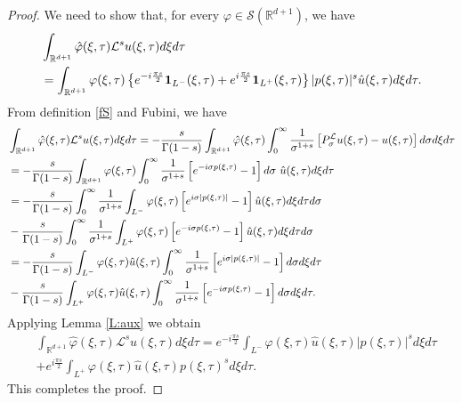 \documentclass[11pt,letter]{amsart}
\def \R {\mathbb{R}}
\def \G{\Gamma}
\def \vf{\varphi}
\numberwithin{equation}{section}
\numberwithin{equation}{section}
\begin{document}
\begin{proof}
 We need to show that, for every $\vf\in \mathscr S(\R^{d+1})$, we have
\begin{align}\label{ex}
& \int_{\R^{d+1}} \hat \vf(\xi,\tau) \mathcal L^{s} u(\xi,\tau) d\xi d\tau
\\
& = \int_{\R^{d+1}} \vf(\xi,\tau) \left\{e^{-i\frac{\pi s}2} \mathbf 1_{L^-}(\xi,\tau) + e^{i\frac{\pi s}2} \mathbf 1_{L^+}(\xi,\tau)\right\}|p(\xi,\tau)|^{s} \hat u(\xi,\tau) d\xi d\tau.
\notag
\end{align}
From definition \eqref{fS}  and Fubini, we have
\begin{align*}
& \int_{\R^{d+1}} \hat \vf(\xi,\tau) \mathcal L^{s} u(\xi,\tau) d\xi d\tau  
 = - \frac{s}{\G(1 - s)} \int_{\R^{d+1}} \hat \vf(\xi,\tau) \int_0^\infty \frac{1}{\sigma^{1+s}} \left[P^\mathcal L_\sigma u(\xi,\tau) - u(\xi,\tau)\right] d\sigma d\xi d\tau
\\
& = - \frac{s}{\G(1 - s)} \int_{\R^{d+1}}\vf(\xi,\tau)\int_0^\infty \frac{1}{\sigma^{1+s}} \left[e^{-i \sigma p(\xi,\tau)} - 1\right]d\sigma\  \hat u(\xi,\tau)  d\xi d\tau 
\\
& = - \frac{s}{\G(1 - s)} \int_0^\infty \frac{1}{\sigma^{1+s}}  \int_{L^-} \vf(\xi,\tau) \left[e^{i \sigma |p(\xi,\tau)|} - 1\right]\hat u(\xi,\tau)  d\xi d\tau d\sigma
\\
&   - \frac{s}{\G(1 - s)} \int_0^\infty \frac{1}{\sigma^{1+s}}  \int_{L^+} \vf(\xi,\tau)\left[e^{-i \sigma p(\xi,\tau)} - 1\right]\hat u(\xi,\tau)  d\xi d\tau d\sigma
\\
& = - \frac{s}{\G(1 - s)} \int_{L^-} \vf(\xi,\tau) \hat u(\xi,\tau) \int_0^\infty \frac{1}{\sigma^{1+s}} \left[e^{i \sigma |p(\xi,\tau)|} - 1\right] d\sigma d\xi d\tau
\notag
\\
&  - \frac{s}{\G(1 - s)}  \int_{L^+} \vf(\xi,\tau) \hat u(\xi,\tau) \int_0^\infty \frac{1}{\sigma^{1+s}}\left[e^{- i \sigma p(\xi,\tau)} - 1\right]d\sigma d\xi d\tau.
\end{align*}
Applying Lemma \ref{L:aux} we obtain
 \begin{align*}
& \int_{\R^{d+1}} \hat \vf(\xi,\tau) \mathcal L^{s} u(\xi,\tau) d\xi d\tau
 = e^{-i\frac{\pi s}2} \int_{L^-} \vf(\xi,\tau) \hat u(\xi,\tau) |p(\xi,\tau)|^{s}  d\xi d\tau
\\
& + e^{i\frac{\pi s}2} \int_{L^+} \vf(\xi,\tau) \hat u(\xi,\tau) p(\xi,\tau)^{s}  d\xi d\tau.
\end{align*}
This completes the proof.



\end{proof}
\end{document}
